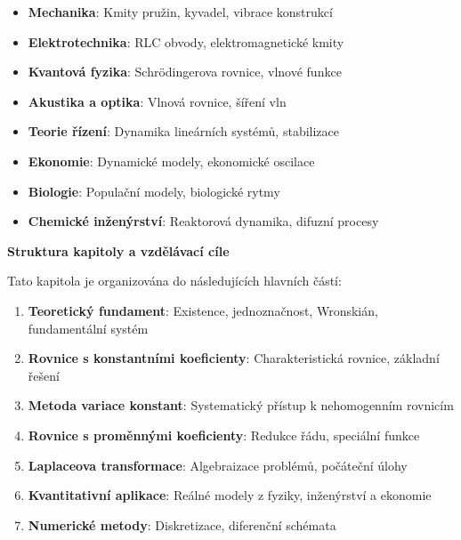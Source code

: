 \begin{itemize}
\item \textbf{Mechanika}: Kmity pružin, kyvadel, vibrace konstrukcí

\item \textbf{Elektrotechnika}: RLC obvody, elektromagnetické kmity

\item \textbf{Kvantová fyzika}: Schrödingerova rovnice, vlnové funkce

\item \textbf{Akustika a optika}: Vlnová rovnice, šíření vln

\item \textbf{Teorie řízení}: Dynamika lineárních systémů, stabilizace

\item \textbf{Ekonomie}: Dynamické modely, ekonomické oscilace

\item \textbf{Biologie}: Populační modely, biologické rytmy

\item \textbf{Chemické inženýrství}: Reaktorová dynamika, difuzní procesy
\end{itemize}

\vspace{1\baselineskip}

\noindent\textbf{Struktura kapitoly a vzdělávací cíle}

Tato kapitola je organizována do následujících hlavních částí:

\begin{enumerate}
\item \textbf{Teoretický fundament}: Existence, jednoznačnost, Wronskián, fundamentální systém

\item \textbf{Rovnice s konstantními koeficienty}: Charakteristická rovnice, základní řešení

\item \textbf{Metoda variace konstant}: Systematický přístup k nehomogenním rovnicím

\item \textbf{Rovnice s proměnnými koeficienty}: Redukce řádu, speciální funkce

\item \textbf{Laplaceova transformace}: Algebraizace problémů, počáteční úlohy

\item \textbf{Kvantitativní aplikace}: Reálné modely z fyziky, inženýrství a ekonomie

\item \textbf{Numerické metody}: Diskretizace, diferenční schémata
\end{enumerate}

